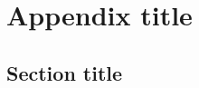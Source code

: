 \documentclass[../main]{subfiles}
\begin{document}
\chapter{Appendix title}
\thispagestyle{fancy}
\label{apxA}

\section{Section title}

\lipsum
\end{document}
